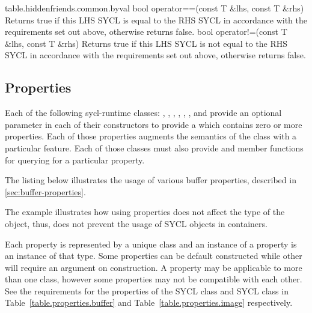 {table.hiddenfriends.common.byval}
   \addRow
   {bool operator==(const T \&lhs, const T \&rhs)}
   {
     Returns true if this LHS SYCL  is equal to the RHS SYCL  in accordance with the requirements set out above, otherwise returns false.
   }
   \addRow
   {bool operator!=(const T \&lhs, const T \&rhs)}
   {
     Returns true if this LHS SYCL  is not equal to the RHS SYCL  in accordance with the requirements set out above, otherwise returns false.
   }
\completeTable

\subsection{Properties}

Each of the following \gls{sycl-runtime} classes: ,
, , ,
, , and  provide an
optional parameter in each of their constructors to provide a
 which contains zero or more properties. Each of those
properties augments the semantics of the class with a particular feature. Each
of those classes must also provide  and
 member functions for querying for a particular
property.

The listing below illustrates the usage of various buffer properties, described in \ref{sec:buffer-properties}.

The example illustrates how using properties does not affect the type
of the object, thus, does not prevent the usage of SYCL objects in
containers.


Each property is represented by a unique class and an instance of a property is an instance of that type. Some properties can be default constructed while other will require an argument on construction. A property may be applicable to more than one class, however some properties may not be compatible with each other. See the requirements for the properties of the SYCL  class and SYCL  class in Table~\ref{table.properties.buffer} and Table~\ref{table.properties.image} respectively.

